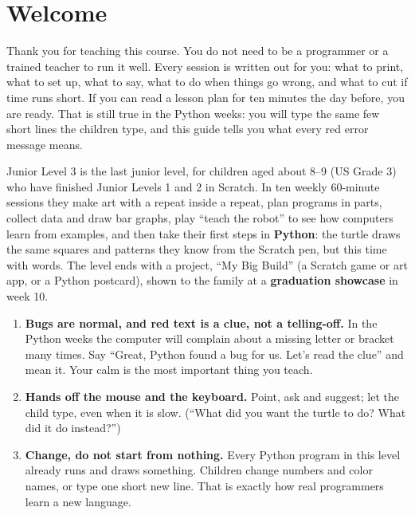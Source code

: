 \documentclass[track=junior,level=3,teacher]{kidscode}
\begin{document}
\tableofcontents

\section{Welcome}
Thank you for teaching this course. You do not need to be a programmer or a trained teacher to run
it well. Every session is written out for you: what to print, what to set up, what to say, what to do
when things go wrong, and what to cut if time runs short. If you can read a lesson plan for ten
minutes the day before, you are ready. That is still true in the Python weeks: you will type the
same few short lines the children type, and this guide tells you what every red error message means.

Junior Level 3 is the last junior level, for children aged about 8--9 (US Grade 3) who have finished
Junior Levels 1 and 2 in Scratch. In ten weekly 60-minute sessions they make art with a repeat inside
a repeat, plan programs in parts, collect data and draw bar graphs, play \enquote{teach the robot} to
see how computers learn from examples, and then take their first steps in \textbf{Python}: the
turtle draws the same squares and patterns they know from the Scratch pen, but this time with words.
The level ends with a project, \enquote{My Big Build} (a Scratch game or art app, or a Python
postcard), shown to the family at a \textbf{graduation showcase} in week 10.

\begin{teachernote}
\begin{enumerate}[itemsep=2pt]
  \item \textbf{Bugs are normal, and red text is a clue, not a telling-off.} In the Python weeks the
        computer will complain about a missing letter or bracket many times. Say \enquote{Great, Python
        found a bug for us. Let's read the clue} and mean it. Your calm is the most important thing you teach.
  \item \textbf{Hands off the mouse and the keyboard.} Point, ask and suggest; let the child type,
        even when it is slow. (\enquote{What did you want the turtle to do? What did it do instead?})
  \item \textbf{Change, do not start from nothing.} Every Python program in this level already runs
        and draws something. Children change numbers and color names, or type one short new line.
        That is exactly how real programmers learn a new language.
\end{enumerate}
\end{teachernote}
\end{document}
